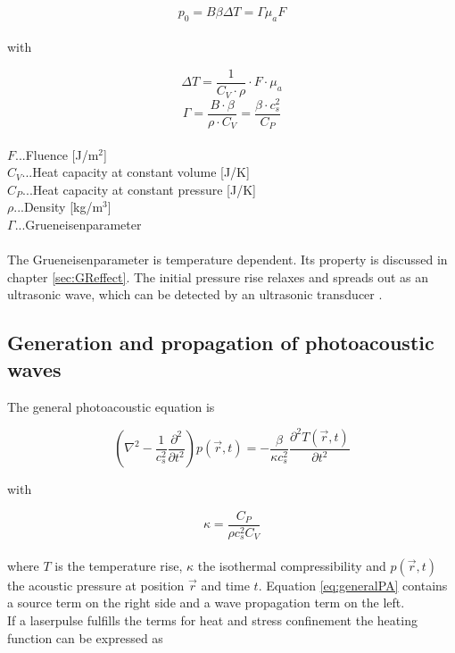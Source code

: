 \begin{equation}
p_0 =  B \beta \Delta T = \Gamma \mu_a F
\label{eq:p_0}
\end{equation}
\\
with 

\begin{equation}
\Delta T =  \frac{1}{C_V \cdot \rho } \cdot F \cdot \mu_a 
\label{eq:deltaT} 
\end{equation}
\begin{equation}
\Gamma =  \frac{B \cdot \beta}{\rho \cdot C_V} = \frac{\beta \cdot c_s^2}{C_P}
\end{equation}
\\
$F$...Fluence [J/m$^2$]\\
$C_V$...Heat capacity at constant volume [J/K]\\
$C_P$...Heat capacity at constant pressure [J/K]\\
$\rho$...Density [kg/m$^3$]\\
$\Gamma$...Grueneisenparameter\\\\

The Grueneisenparameter is temperature dependent.  Its property is discussed in chapter \ref{sec:GReffect}. The initial pressure rise relaxes and spreads out as an ultrasonic wave, which can be detected by an ultrasonic transducer \cite{GraflMonika2015Pm, doi:10.1021/cr010436c, WangLihongV2012BO:P}.

\subsection{Generation and propagation of photoacoustic waves}

The general photoacoustic equation is \cite{Wang:PAMtutorial}

\begin{equation}
	\left( \nabla^2 - \frac{1}{c_s^2} \frac{\partial^2}{\partial t^2}\right)p(\vec{r},t) = - \frac{\beta}{\kappa c_s^2}\frac{\partial^2T(\vec{r},t)}{\partial t^2}
	\label{eq:generalPA}
\end{equation}

with

\begin{equation}
	\kappa = \frac{C_P}{\rho c_s^2 C_V}
\end{equation}
\\
where $T$ is the temperature rise, $\kappa$ the isothermal compressibility and $p(\vec{r},t)$ the acoustic pressure at position $\vec{r}$ and time $t$. Equation \ref{eq:generalPA} contains a source term on the right side and a wave propagation term on the left.\\
If a laserpulse fulfills the terms for heat and stress confinement the heating function can be expressed as

